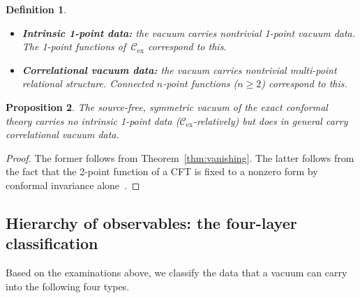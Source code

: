 \documentclass[
  aps,
  prd,
  preprint,
  groupedaddress,
  nofootinbib,
  longbibliography
]{revtex4-2}
\newtheorem{definition}{Definition}[section]
\newtheorem{proposition}[definition]{Proposition}
\theoremstyle{remark}
\newcommand{\Cex}{\mathcal{C}_{\mathrm{ex}}}
\begin{document}
\begin{definition}\label{def:intrinsic-vs-corr}
\begin{itemize}
\item \textbf{Intrinsic 1-point data:} the vacuum carries
  nontrivial 1-point vacuum data.
  The 1-point functions of~$\Cex$ correspond to this.
\item \textbf{Correlational vacuum data:} the vacuum carries
  nontrivial multi-point relational structure.
  Connected $n$-point functions ($n\geq 2$) correspond to this.
\end{itemize}
\end{definition}

\begin{proposition}\label{prop:corr-nonzero}
The source-free, symmetric vacuum of the exact conformal theory
carries no intrinsic 1-point data ($\Cex$-relatively) but does
in general carry correlational vacuum data.
\end{proposition}

\begin{proof}
The former follows from Theorem~\ref{thm:vanishing}.
The latter follows from the fact that the 2-point function of a
CFT is fixed to a nonzero form by conformal invariance
alone~\cite{ref5,ref13,ref14}.
\end{proof}

\subsection{Hierarchy of observables: the four-layer
  classification}\label{subsec:6-5}

Based on the examinations above, we classify the data that a
vacuum can carry into the following four types.
\end{document}
